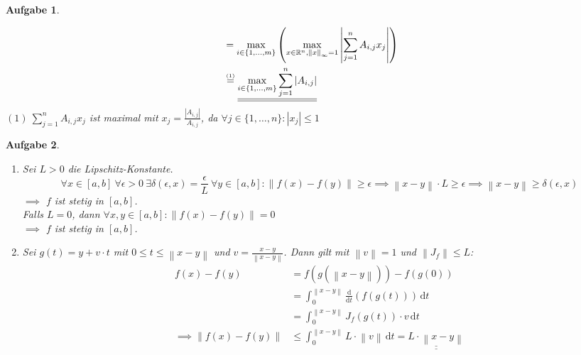 \documentclass[11pt]{article}
\theoremstyle{break}
\newtheorem{task}{Aufgabe}
\newcommand{\set}[1]{\ensuremath{\{#1\}}}
\newcommand{\abs}[1]{\ensuremath{\left\vert #1 \right\vert}}
\newcommand{\norm}[1]{\ensuremath{\left\| #1 \right\|}}
\newcommand{\R}{\ensuremath{\mathbb{R}}}
\begin{document}
\begin{task}
\begin{enumerate} [label={(\alph*)}]
\begin{align*}
            &= \max\limits_{i\in\set{1,\dots,m}}\left(\max\limits_{x\in \R^n, \norm{x}_\infty = 1}\abs{\sum\limits_{j=1}^n A_{i,j}x_j}\right)\\
            &\stackrel{\mbox{\tiny (1)}}{=} \underline{\underline{\max\limits_{i\in\set{1,\dots,m}}\sum\limits_{j=1}^n \abs{A_{i,j}}}}
        \end{align*}
        $(1)\ \sum\limits_{j=1}^n A_{i,j}x_j$ ist maximal mit $x_j = \frac{\abs{A_{i,j}}}{A_{i,j}}$, da $\forall j\in\set{1,\dots,n}:\abs{x_j}\leq 1$
    \end{enumerate}
\end{task}
\newpage
\begin{task}
    \hfill\vspace{-5mm}
    \begin{enumerate} [label={(\alph*)}]
        \item Sei $L>0$ die Lipschitz-Konstante. $$\forall x\in [a,b]\ \forall \epsilon>0\ \exists \delta(\epsilon, x)=\frac{\epsilon}{L}\ \forall y\in [a,b]: \norm{f(x)-f(y)} \geq \epsilon \implies \norm{x-y}\cdot L \geq \epsilon \implies \norm{x-y}\geq\delta(\epsilon, x)$$
        $\implies$ $f$ ist stetig in $[a,b]$.\vspace{3mm}\\
        Falls $L=0$, dann $\forall x,y\in [a,b]: \norm{f(x)-f(y)}=0$\\
        $\implies$ $f$ ist stetig in $[a,b]$.
        \item Sei $g(t)=y+v\cdot t$ mit $0\leq t\leq \norm{x-y}$ und $v=\frac{x-y}{\norm{x-y}}$. Dann gilt mit $\norm{v}=1$ und $\norm{J_f}\leq L$:
        \begin{align*}
            f(x)-f(y)&=f(g(\norm{x-y}))-f(g(0))\\
            &= \int_{0}^{\norm{x-y}} \frac{\mathrm{d}}{\mathrm{d}t}(f(g(t)))\,\mathrm{d}t\\
            &= \int_{0}^{\norm{x-y}} J_f(g(t))\cdot v\,\mathrm{d}t\\
            \implies \norm{f(x)-f(y)}&\leq \int_{0}^{\norm{x-y}} L\cdot \norm{v}\,\mathrm{d}t = \underline{\underline{L\cdot \norm{x-y}}}
        \end{align*}
    \end{enumerate}
\end{task}
\end{document}
